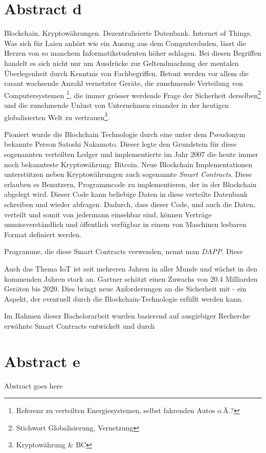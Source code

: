 \chapter{Abstract d}
\label{cha:abstract_d}

Blockchain. Kryptowährungen. Dezentralisierte Datenbank. Internet of Things. Was sich für Laien anhört wie ein Auszug aus dem Computerduden, lässt die Herzen von so manchem Informatikstudenten höher schlagen. Bei diesen Begriffen handelt es sich nicht nur um Ausdrücke zur Geltendmachung der mentalen Überlegenheit durch Kenntnis von Fachbegriffen. Betont werden vor allem die rasant wachsende Anzahl vernetzter Geräte, die zunehmende Verteilung von Computersystemen \footnote{Referenz zu verteilten Energiesystemen, selbst fahrenden Autos o.Ä.?}, die immer grösser werdende Frage der Sicherheit derselben\footnote{Stichwort Globalisierung, Vernetzung} und die zunehmende Unlust von Unternehmen einander in der heutigen globalisierten Welt zu vertrauen\footnote{Kryptowährung \& BC}.

Pioniert wurde die Blockchain Technologie durch eine unter dem Pseudonym bekannte Person Satoshi Nakamoto. Dieser legte den Grundstein für diese sogenannten verteilten Ledger und implementierte im Jahr 2007  die heute immer noch bekannteste Kryptowährung: Bitcoin. Neue Blockchain Implementationen unterstützen neben Kryptowährungen auch sogenannte \emph{Smart Contracts}. Diese erlauben es Benutzern, Programmcode zu implementieren, der in der Blockchain abgelegt wird. Dieser Code kann beliebige Daten in diese verteilte Datenbank schreiben und wieder abfragen. Dadurch, dass dieser Code, und auch die Daten, verteilt und somit von jedermann einsehbar sind, können Verträge unmissverständlich und öffentlich verfügbar in einem von Maschinen lesbaren Format definiert werden.

Programme, die diese Smart Contracts verwenden, nennt man \emph{\acrfull{DAPP}}. Diese 


\cite{BlockchainRevolution}

Auch das Thema \acrshort{IoT} ist seit mehreren Jahren in aller Munde und wächst in den kommenden Jahren stark an. Gartner schätzt einen Zuwachs von 20.4 Milliarden Geräten bis 2020. Dies bringt neue Anforderungen an die Sicherheit mit - ein Aspekt, der eventuell durch die Blockchain-Technologie erfüllt werden kann.\cite{gartner.com_iot,BlockchainRevolution}

Im Rahmen dieser Bachelorarbeit wurden basierend auf ausgiebiger Recherche erwähnte Smart Contracts entwickelt und durch 


\chapter{Abstract e}
\label{cha:abstract_e}

Abstract goes here
